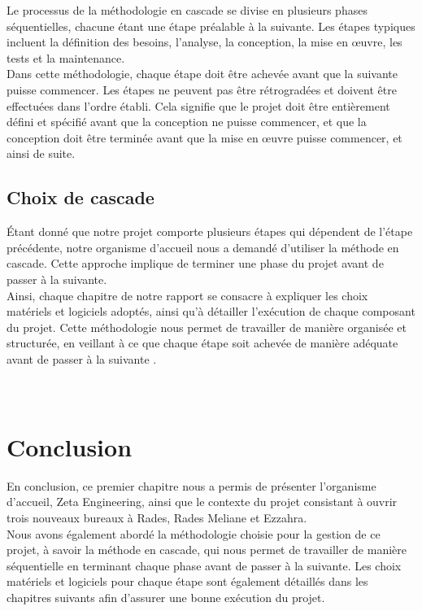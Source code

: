 Le processus de la méthodologie en cascade se divise en plusieurs phases séquentielles, chacune étant une étape préalable à la suivante. Les étapes typiques incluent la définition des besoins, l'analyse, la conception, la mise en œuvre, les tests et la maintenance. \\

Dans cette méthodologie, chaque étape doit être achevée avant que la suivante puisse commencer. Les étapes ne peuvent pas être rétrogradées et doivent être effectuées dans l'ordre établi. Cela signifie que le projet doit être entièrement défini et spécifié avant que la conception ne puisse commencer, et que la conception doit être terminée avant que la mise en œuvre puisse commencer, et ainsi de suite. \\



\subsection{Choix de cascade}

Étant donné que notre projet comporte plusieurs étapes qui dépendent de l'étape précédente, notre organisme d'accueil nous a demandé d'utiliser la méthode en cascade. Cette approche implique de terminer une phase du projet avant de passer à la suivante.\\ 


Ainsi, chaque chapitre de notre rapport se consacre à expliquer les choix matériels et logiciels adoptés, ainsi qu'à détailler l'exécution de chaque composant du projet. Cette méthodologie nous permet de travailler de manière organisée et structurée, en veillant à ce que chaque étape soit achevée de manière adéquate avant de passer à la suivante \cite{fagarasan2021agile} .\\\\\




\section{Conclusion }
En conclusion, ce premier chapitre nous a permis de présenter l'organisme d'accueil, Zeta Engineering, ainsi que le contexte du projet consistant à ouvrir trois nouveaux bureaux à Rades, Rades Meliane et Ezzahra. \\

Nous avons également abordé la méthodologie choisie pour la gestion de ce projet, à savoir la méthode en cascade, qui nous permet de travailler de manière séquentielle en terminant chaque phase avant de passer à la suivante. Les choix matériels et logiciels pour chaque étape sont également détaillés dans les chapitres suivants afin d'assurer une bonne exécution du projet. \\
